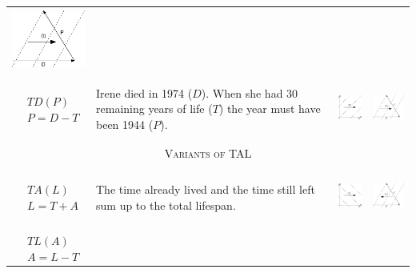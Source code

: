 \documentclass[
  12pt
]{scrartcl}
\begin{document}
\begin{center}
\begin{longtable}{m{}m{}m{}m{}}
  \includegraphics[height = 2cm]{../fig/PDt_iso.pdf}  \\
  $$\begin{aligned}
    &TD(P) \\
    &P = D - T
  \end{aligned}$$ &
  Irene died in 1974 ($D$). When she had 30 remaining years of life ($T$) the year must have been 1944 ($P$). &
  \includegraphics[height = 2cm]{../fig/TDp.pdf} &
  \includegraphics[height = 2cm]{../fig/TDp_iso.pdf}  \\
  \midrule
  \multicolumn{4}{c}{\textsc{Variants of TAL}} \\
  \midrule
  $$\begin{aligned}
    &TA(L) \\
    &L = T + A
  \end{aligned}$$ &
  The time already lived and the time still left sum up to the total lifespan. &
  \includegraphics[height = 2cm]{../fig/TAl.pdf} &
  \includegraphics[height = 2cm]{../fig/TAl_iso.pdf}  \\
  $$\begin{aligned}
    &TL(A) \\
    &A = L - T
  \end{aligned}$$ &

\end{longtable}
\end{center}
\end{document}
